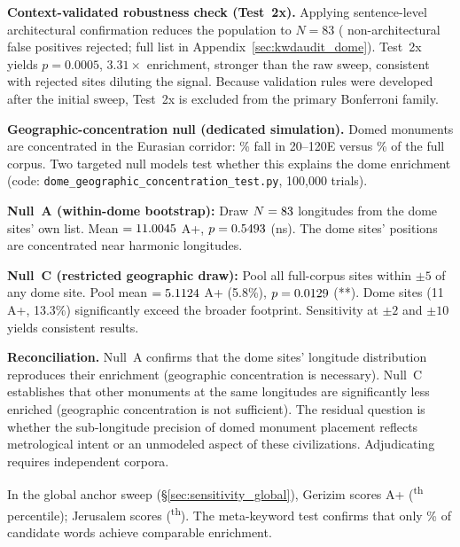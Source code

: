 \documentclass[12pt,a4paper]{article}
\begin{document}
\textbf{Context-validated robustness check (Test~2x).}
Applying sentence-level architectural confirmation reduces the population
to $N = 83$ (\NcircContextRejected{} non-architectural false positives
rejected; full list in Appendix~\ref{sec:kwdaudit_dome}).
Test~2x yields $p = 0.0005$, $3.31\times$ enrichment, stronger than the
raw sweep, consistent with rejected sites diluting the signal.
Because validation rules were developed after the initial sweep, Test~2x
is excluded from the primary Bonferroni family.

\textbf{Geographic-concentration null (dedicated simulation).}
\label{sec:geo_conc_null}
Domed monuments are concentrated in the Eurasian corridor:
\domeEurasianFraction\% fall in 20\textdegree--120\textdegree{}E
versus \fullCorpusEurasianFraction\% of the full corpus.
Two targeted null models test whether this explains the dome enrichment
(code: \texttt{dome\_geographic\_concentration\_test.py}, 100{,}000 trials).

\textbf{Null~A (within-dome bootstrap):} Draw $N = 83$ longitudes
from the dome sites' own list. Mean $= 11.0045$ A+,
$p = 0.5493$ (ns). The dome sites' positions are concentrated
near harmonic longitudes.

\textbf{Null~C (restricted geographic draw):} Pool all
\geoNullDomeRestrictedN{} full-corpus sites within $\pm 5$\textdegree{} of
any dome site. Pool mean $= 5.1124$ A+ (5.8\%),
$p = 0.0129$ (**). Dome sites (11 A+, 13.3\%) significantly
exceed the broader footprint. Sensitivity at $\pm 2$\textdegree{} and
$\pm 10$\textdegree{} yields consistent results.

\textbf{Reconciliation.}
Null~A confirms that the dome sites' longitude distribution reproduces their
enrichment (geographic concentration is necessary). Null~C establishes that
other monuments at the same longitudes are significantly less enriched
(geographic concentration is not sufficient). The residual question is whether
the sub-longitude precision of domed monument placement reflects metrological
intent or an unmodeled aspect of these civilizations. Adjudicating requires
independent corpora.

In the global anchor sweep (\S\ref{sec:sensitivity_global}),
Gerizim scores \GerizimSweepAp{} A+ (\anchorSweepPctile{}\textsuperscript{th}
percentile); Jerusalem scores \JerusalemSweepAp{}
(\JerusalemSweepPctile{}\textsuperscript{th}).
The meta-keyword test confirms that only \metaBeatingChiPct\% of
\NmetaKeywords{} candidate words achieve comparable enrichment.
\end{document}
